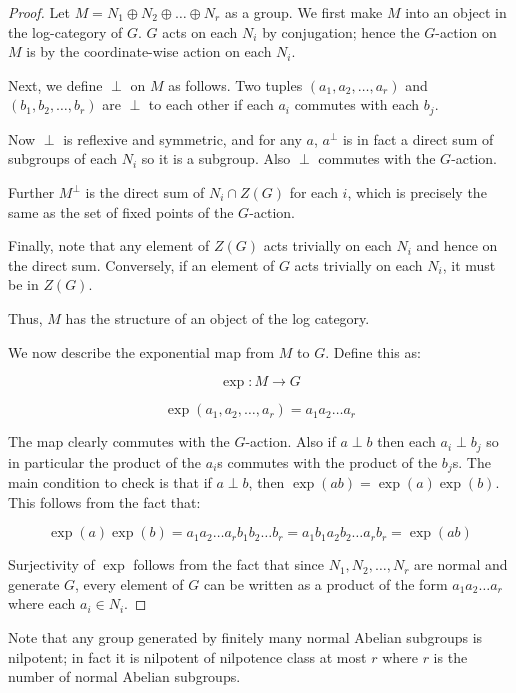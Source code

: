 \documentclass[a4paper]{amsart}
\begin{document}
\begin{proof}
  Let $M = N_1 \oplus N_2 \oplus \ldots \oplus N_r$ as a group.  We
  first make $M$ into an object in the log-category of $G$. $G$ acts
  on each $N_i$ by conjugation; hence the $G$-action on $M$ is by the
  coordinate-wise action on each $N_i$.

  Next, we define $\perp$ on $M$ as follows. Two tuples
  $(a_1,a_2,\ldots,a_r)$ and $(b_1,b_2,\ldots,b_r)$ are $\perp$ to
  each other if each $a_i$ commutes with each $b_j$.

  Now $\perp$ is reflexive and symmetric, and for any $a$, $a^\perp$
  is in fact a direct sum of subgroups of each $N_i$ so it is a
  subgroup. Also $\perp$ commutes with the $G$-action.

  Further $M^\perp$ is the direct sum of $N_i \cap Z(G)$ for
  each $i$, which is precisely the same as the set of fixed points of
  the $G$-action. 

  Finally, note that any element of $Z(G)$ acts trivially on each
  $N_i$ and hence on the direct sum. Conversely, if an element of $G$
  acts trivially on each $N_i$, it must be in $Z(G)$.

  Thus, $M$ has the structure of an object of the log category.

  We now describe the exponential map from $M$ to $G$. Define this as:

  $$\exp:M \to G$$

  $$\exp(a_1,a_2,\ldots,a_r) = a_1a_2\ldots a_r$$

  The map clearly commutes with the $G$-action. Also if $a \perp b$
  then each $a_i \perp b_j$ so in particular the product of the $a_i$s
  commutes with the product of the $b_j$s. The main condition to check
  is that if $a \perp b$, then $\exp(ab) = \exp(a)\exp(b)$. This
  follows from the fact that:

  $$\exp(a)\exp(b) = a_1a_2\ldots a_rb_1b_2\ldots b_r = a_1b_1a_2b_2 \ldots a_rb_r = \exp(ab)$$

  Surjectivity of $\exp$ follows from the fact that since $N_1, N_2,
  \ldots, N_r$ are normal and generate $G$, every element of $G$ can
  be written as a product of the form $a_1a_2\ldots a_r$ where each
  $a_i \in N_i$.
\end{proof}

Note that any group generated by finitely many normal Abelian
subgroups is nilpotent; in fact it is nilpotent of nilpotence class at
most $r$ where $r$ is the number of normal Abelian subgroups. 
\end{document}
